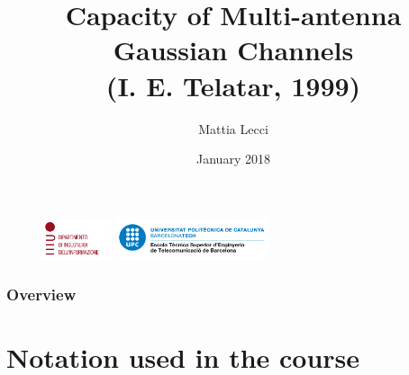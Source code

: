 \documentclass[]{beamer}
\title[Notation]{Capacity of Multi-antenna Gaussian Channels\\
	(I. E. Telatar, 1999)} %
\author[Lecci]{Mattia Lecci\inst{1}\inst{2}} %
\institute[UniPD/UPC] %
{
	\inst{1}
	Universit\`a degli Studi di Padova\\
	Department of Information Engineering\\
	(DEI-UniPD)
	\and
	\inst{2}
	Universitat Polit\`{e}cnica de Catalunya\\ %
	Escola T\`ecnica Superior d'Engenyeria de Telecomunicaci\'o  de Barcelona\\
	(UPC-ETSETB)
}
\date{January 2018} %
\begin{document}
\begin{frame}
\titlepage %
\begin{figure}
	\hspace{2cm}
	\includegraphics[height = 1.2cm]{img/dei_logo}
	\hfill
	\includegraphics[height = 1.2cm]{img/ETSETB-positiu-p3005}
	\hspace{1cm}
\end{figure}
\end{frame}

\begin{frame}
\frametitle{Overview} %
	\tableofcontents
\end{frame}


\section{Notation used in the course} %

\end{document}
